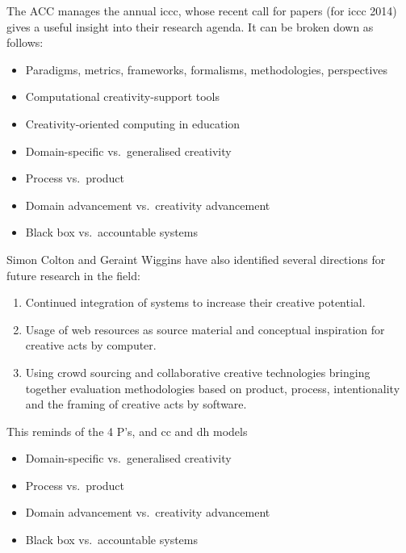 The ACC manages the annual \gls{iccc}, whose recent call for papers  (for \gls{iccc} 2014) gives a useful insight into their research agenda. It can be broken down as follows:

\begin{itemize}
  \item Paradigms, metrics, frameworks, formalisms, methodologies, perspectives
  \item Computational creativity-support tools
  \item Creativity-oriented computing in education
  \item Domain-specific vs.\ generalised creativity
  \item Process vs.\ product
  \item Domain advancement vs.\ creativity advancement
  \item Black box vs.\ accountable systems
\end{itemize}

Simon Colton and Geraint Wiggins have also identified several directions for future research in the field: \citep[p.5]{Colton2012}

\begin{enumerate}
  \item Continued integration of systems to increase their creative potential.
  \item Usage of web resources as source material and conceptual inspiration for creative acts by computer.
  \item Using crowd sourcing and collaborative creative technologies bringing together evaluation methodologies based on product, process, intentionality and the framing of creative acts by software.
\end{enumerate}

\begin{draft}
  This reminds of the 4 P’s, and \gls{cc} and \gls{dh} models
\end{draft}

\begin{shaded}
  \begin{itemize}
  \item Domain-specific vs.\ generalised creativity
  \item Process vs.\ product
  \item Domain advancement vs.\ creativity advancement
  \item Black box vs.\ accountable systems
  \end{itemize}
\end{shaded}


